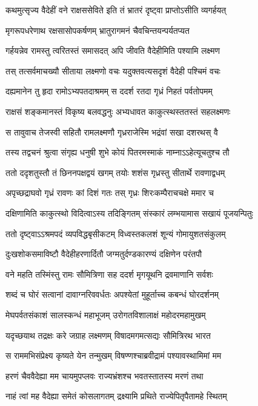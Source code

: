 \twolineshloka
{कथमुत्सृज्य वैदेहीं वने राक्षससेविते}
{इति तं भ्रातरं दृष्ट्वा प्राप्तोऽसीति व्यगर्हयत्}


\twolineshloka
{मृगरूपधरेणाथ रक्षसासोपकर्षणम्}
{भ्रातुरागमनं चैवचिन्तयन्पर्यतप्यत}


\twolineshloka
{गर्हयन्नेव रामस्तु त्वरितस्तं समासदत्}
{अपि जीवति वैदेहीमिति पश्यामि लक्ष्मण}


\twolineshloka
{तस् तत्सर्वमाचख्यौ सीताया लक्ष्मणो वचः}
{यदुक्तवत्यसदृशं वैदेही पश्चिमं वचः}


\twolineshloka
{दह्यमानेन तु हृदा रामोऽभ्यपतदाश्रमम्}
{स ददर्श रतदा गृध्रं निहतं पर्वतोपमम्}


\twolineshloka
{राक्षसं शङ्कमानस्तं विकृष्य बलवद्धनुः}
{अभ्यधावत काकुत्स्थस्ततस्तं सहलक्ष्मणः}


\twolineshloka
{स तावुवाच तेजस्वी सहितौ रामलक्ष्मणौ}
{गृध्रराजेस्मि भद्रंवां सखा दशरथस् वै}


\twolineshloka
{तस्य तद्वचनं श्रुत्वा संगृह्य धनुषी शुभे}
{कोयं पितरमस्माकं नाम्नाऽऽहेत्यूचतुश्च तौ}


\twolineshloka
{ततो ददृशतुस्तौ तं छिननपक्षद्वयं खगम्}
{तयोः शशंस गृध्रस्तु सीतार्थे रावणाद्वधम्}


\twolineshloka
{अपृच्छद्राघवो गृध्रं रावणः कां दिशं गतः}
{तस् गृध्रः शिरःकम्पैराचचक्षे ममार च}


\twolineshloka
{दक्षिणामिति काकुत्स्थो विदित्वाऽस्य तदिङ्गितम्}
{संस्कारं लम्भयामास सखायं पूजयन्पितुः}


\twolineshloka
{ततो दृष्ट्वाऽऽश्रमपदं व्यपविद्धबृसीकटम्}
{विध्वस्तकलशं शून्यं गोमायुशतसंकुलम्}


\twolineshloka
{दुःखशोकसमाविष्टौ वैदेहीहरणार्दितौ}
{जग्मतुर्दण्डकारण्यं दक्षिणेन परंतपौ}


\twolineshloka
{वने महति तस्मिंस्तु रामः सौमित्रिणा सह}
{ददर्श मृगयूथनि द्रवमाणानि सर्वशः}


\twolineshloka
{शब्दं च घोरं सत्वानां दावाग्नरिववर्धतः}
{अपश्येतां मुहूर्ताच्च कबन्धं घोरदर्शनम्}


\twolineshloka
{मेघपर्वतसंकाशं सालस्कन्धं महाभूजम्}
{उरोगतविशालाक्षं महोदरमहामुखम्}


\twolineshloka
{यदृच्छयाथ तद्रक्षः करे जग्राह लक्ष्मणम्}
{विषादमगमत्सद्यः सौमित्रिरथ भारत}


\twolineshloka
{स राममभिसंप्रेक्ष्य कृष्यते येन तन्मुखम्}
{विषण्णश्चाब्रवीद्रामं पश्यावस्थामिमां मम}


\twolineshloka
{हरणं चैववैदेह्या मम चायमुपप्लवः}
{राज्यभ्रंशश्च भवतस्तातस्य मरणं तथा}


\twolineshloka
{नाहं त्वां मह वैदेह्या समेतं कोसलागतम्}
{द्रक्ष्यामि प्रथिते राज्येपितृपैतामहे स्थितम्}



